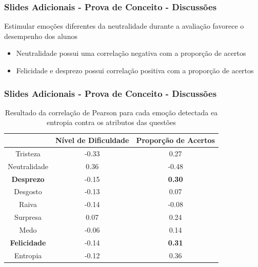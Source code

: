 \begin{frame}
\frametitle{Slides Adicionais - Prova de Conceito - Discussões}
\begin{block}{Estimular emo\c{c}\~oes diferentes da neutralidade durante a avalia\c{c}\~ao favorece o desempenho dos alunos}
\begin{itemize}
\item Neutralidade possui uma correla\c{c}\~ao negativa com a propor\c{c}\~ao de acertos
\pause
\item Felicidade e desprezo possui correla\c{c}\~ao positiva com a propor\c{c}\~ao de acertos
\end{itemize}
\end{block}

\end{frame}

\begin{frame}
\frametitle{Slides Adicionais - Prova de Conceito - Discussões}
\begin{table}[]\footnotesize
\centering
\caption{Resultado​ ​da​ ​correla\c{c}\~ao​ ​de​ ​Pearson​ ​para​ ​cada​ ​emo\c{c}\~ao​ ​detectada
e​ ​a​ ​entropia​ ​contra​ ​os​ ​atributos​ ​das​ ​quest\~oes}
\label{my-label}
\begin{tabular}{|c|c|c|}
\hline
                      & \textbf{Nível de Dificuldade} & \textbf{Proporção de Acertos} \\ \hline
Tristeza	     & -0.33                & 0.27                          \\ \hline
Neutralidade & 0.36                 & -0.48                \\ \hline
\small \textbf{Desprezo}     		& -0.15                         & \small \textbf{0.30}                 \\ \hline
Desgosto              & -0.13                         & 0.07                          \\ \hline
Raiva                 & -0.14                         & -0.08                         \\ \hline
Surpresa              & 0.07                          & 0.24                          \\ \hline
Medo                  & -0.06                         & 0.14                          \\ \hline
\small \textbf{Felicidade}   		& -0.14                         & \small \textbf{0.31}                 \\ \hline
Entropia     		& -0.12                         & 0.36                 \\ \hline
\end{tabular}
\end{table}
\end{frame}





